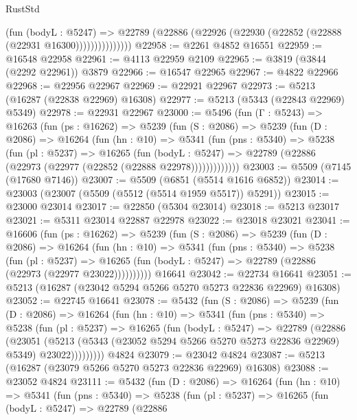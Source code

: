 \begin{lexlean}{RustStd}
\begin{coremodule}
                    (fun (bodyL : @5247) =>
                    @22789 (@22886 (@22926 (@22930 (@22852 (@22888 (@22931 @16300)))))))))))))))
@22958 := @2261 @4852 @16551
@22959 := @16548 @22958
@22961 := @4113 @22959 @2109
@22965 := @3819 (@3844 (@2292 @22961)) @3879
@22966 := @16547 @22965
@22967 := @4822 @22966
@22968 := @22956 @22967
@22969 := @22921 @22967
@22973 := @5213 (@16287 (@22838 @22969) @16308)
@22977 := @5213 (@5343 (@22843 @22969) @5349)
@22978 := @22931 @22967
@23000 := @5496
    (fun (Γ : @5243) =>
    @16263
      (fun (ps : @16262) =>
      @5239
        (fun (S : @2086) =>
        @5239
          (fun (D : @2086) =>
          @16264
            (fun (hn : @10) =>
            @5341
              (fun (pns : @5340) =>
              @5238
                (fun (pl : @5237) =>
                @16265
                  (fun (bodyL : @5247) =>
                  @22789 (@22886 (@22973 (@22977 (@22852 (@22888 @22978)))))))))))))
@23003 := @5509 (@7145 (@17680 @7146))
@23007 := @5509 (@6851 (@5514 @1616 @6852))
@23014 := @23003 (@23007 (@5509 (@5512 (@5514 @1959 @5517)) @5291))
@23015 := @23000 @23014
@23017 := @22850 (@5304 @23014)
@23018 := @5213 @23017
@23021 := @5311 @23014 @22887 @22978
@23022 := @23018 @23021
@23041 := @16606
    (fun (ps : @16262) =>
    @5239
      (fun (S : @2086) =>
      @5239
        (fun (D : @2086) =>
        @16264
          (fun (hn : @10) =>
          @5341
            (fun (pns : @5340) =>
            @5238
              (fun (pl : @5237) =>
              @16265 (fun (bodyL : @5247) => @22789 (@22886 (@22973 (@22977 @23022))))))))))
    @16641
@23042 := @22734 @16641
@23051 := @5213 (@16287 (@23042 @5294 @5266 @5270 @5273 @22836 @22969) @16308)
@23052 := @22745 @16641
@23078 := @5432
    (fun (S : @2086) =>
    @5239
      (fun (D : @2086) =>
      @16264
        (fun (hn : @10) =>
        @5341
          (fun (pns : @5340) =>
          @5238
            (fun (pl : @5237) =>
            @16265
              (fun (bodyL : @5247) =>
              @22789
                (@22886
                  (@23051
                    (@5213
                      (@5343 (@23052 @5294 @5266 @5270 @5273 @22836 @22969) @5349)
                      @23022)))))))))
    @4824
@23079 := @23042 @4824
@23087 := @5213 (@16287 (@23079 @5266 @5270 @5273 @22836 @22969) @16308)
@23088 := @23052 @4824
@23111 := @5432
    (fun (D : @2086) =>
    @16264
      (fun (hn : @10) =>
      @5341
        (fun (pns : @5340) =>
        @5238
          (fun (pl : @5237) =>
          @16265
            (fun (bodyL : @5247) =>
            @22789
              (@22886

\end{coremodule}
\end{lexlean}
